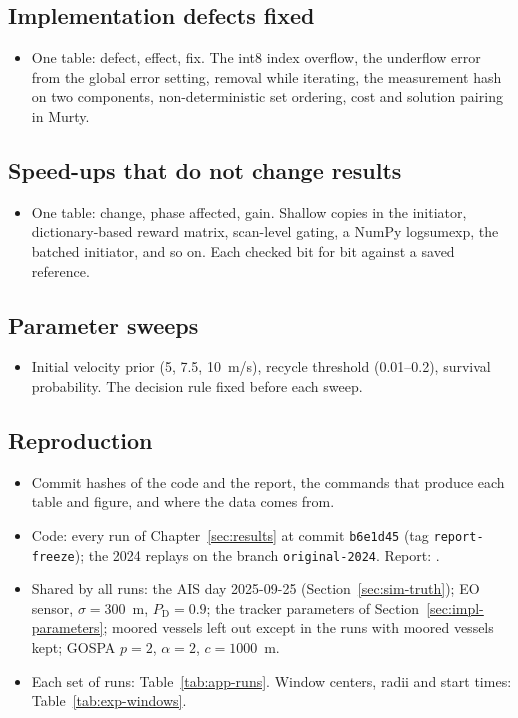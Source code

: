 \subsection{Implementation defects fixed}
\label{app:defects}
\begin{itemize}
    \item One table: defect, effect, fix. The int8 index overflow, the underflow error from the global error setting, removal while iterating, the measurement hash on two components, non-deterministic set ordering, cost and solution pairing in Murty.
\end{itemize}

\subsection{Speed-ups that do not change results}
\label{app:speedups}
\begin{itemize}
    \item One table: change, phase affected, gain. Shallow copies in the initiator, dictionary-based reward matrix, scan-level gating, a NumPy logsumexp, the batched initiator, and so on. Each checked bit for bit against a saved reference.
\end{itemize}

\subsection{Parameter sweeps}
\label{app:sweeps}
\begin{itemize}
    \item Initial velocity prior (5, 7.5, 10~m/s), recycle threshold (0.01--0.2), survival probability. The decision rule fixed before each sweep.
\end{itemize}

\subsection{Reproduction}
\label{app:reproduction}
\begin{itemize}
    \item Commit hashes of the code and the report, the commands that produce each table and figure, and where the data comes from.
    \item Code: every run of Chapter~\ref{sec:results} at commit \texttt{b6e1d45} (tag \texttt{report-freeze}); the 2024 replays on the branch \texttt{original-2024}. Report: .
    \item Shared by all runs: the AIS day 2025-09-25 (Section~\ref{sec:sim-truth}); EO sensor, $\sigma = 300$~m, $P_{\mathrm{D}} = 0.9$; the tracker parameters of Section~\ref{sec:impl-parameters}; moored vessels left out except in the runs with moored vessels kept; GOSPA $p = 2$, $\alpha = 2$, $c = 1000$~m.
    \item Each set of runs: Table~\ref{tab:app-runs}. Window centers, radii and start times: Table~\ref{tab:exp-windows}.
\end{itemize}

